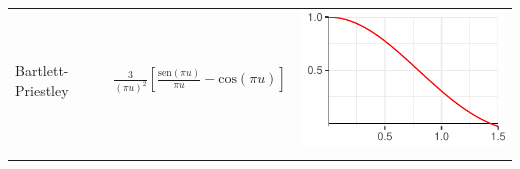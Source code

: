 \documentclass[12pt,letterpaper]{book}
\newcommand{\COS}[1]{\mathrm{cos}\left( #1 \right)}
\newcommand{\SEN}[1]{\mathrm{sen}\left( #1 \right)}
\newcommand{\bottomrulec}{%
  \arrayrulecolor{black}
  \arrayrulecolor{gris}\specialrule{\belowrulesep}{0pt}{0pt}
  \arrayrulecolor{black}\specialrule{\lightrulewidth}{0pt}{\belowrulesep}
}
\begin{document}
\begin{table}
\begin{small}
\begin{tabular}{lll}
\rowcolor{gris}
Bartlett-Priestley &
$\displaystyle 
\frac{3}{(\pi u)^{2}} \left[ \frac{\SEN{\pi u}}{\pi u} - \COS{\pi u} \right]
$
& \includegraphics[scale=.4]{./img_ventanas/ventana_bartlet_priestley.pdf} \\
\bottomrulec
\end{tabular}
\end{small}
\end{table}
\end{document}
